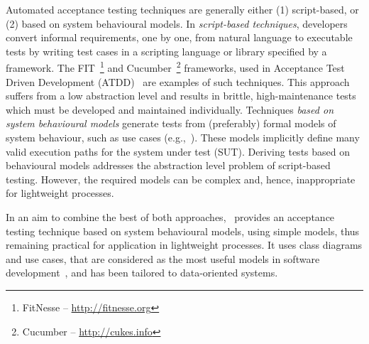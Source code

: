  

Automated acceptance testing techniques are generally either (1) script-based, or (2) based on system behavioural models. 
In \textit{script-based techniques}, developers convert informal requirements, one by one, from natural language to executable tests by writing test cases in a scripting language or library specified by a framework. The FIT~\footnote{FitNesse – \url{http://fitnesse.org}} and Cucumber~\footnote{Cucumber – \url{http://cukes.info}} frameworks, used in Acceptance Test Driven Development (ATDD)~\cite{Pugh2011} are examples of such techniques. This approach suffers from a low abstraction level and results in brittle, high-maintenance tests which must be developed and maintained individually. 
Techniques \textit{based on system behavioural models} generate tests from (preferably) formal models of system behaviour, such as use cases (e.g.,~\cite{Nebut2006,Sarma2007,Kaplan2008}). These models implicitly define many valid execution paths for the system under test (SUT). %
Deriving tests based on behavioural models addresses the abstraction level problem of script-based testing. However, the required models can be complex and, hence, inappropriate for lightweight processes.%

In an aim to combine the best of both approaches, \this~provides an acceptance testing technique based on system behavioural models, using simple models, thus remaining practical for application in lightweight processes.%
It uses class diagrams and use cases, that are considered as the most useful models in software development~\cite{Erickson2007,Erickson2008}, and has been tailored to data-oriented systems.


